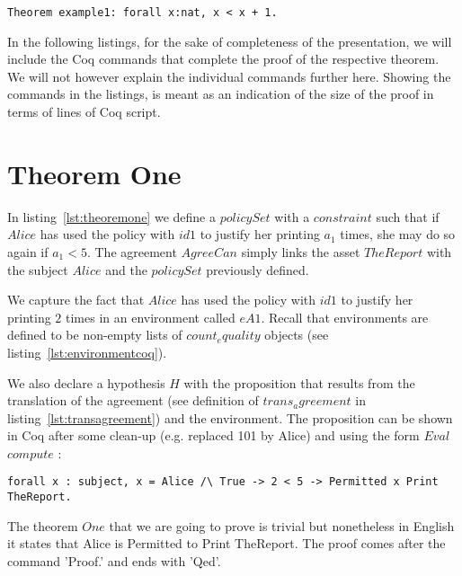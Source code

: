\lstset{language=Coq}
\begin{lstlisting}[frame=single, caption={Proof Example},label={lst:proofexample}]
Theorem example1: forall x:nat, x < x + 1.
\end{lstlisting}

In the following listings, for the sake of completeness of the presentation, we will include the Coq commands that complete the proof of the respective theorem. We will not however explain the individual commands further here. Showing the commands in the listings, is meant as an indication of the size of the proof in terms of lines of Coq script.


\section{Theorem One}

In listing~\ref{lst:theoremone} we define a $policySet$ with a $constraint$ such that if $Alice$ has used the policy with $id1$ to justify her printing $a_{1}$ times, she may do so again if $a_{1} < 5$. The agreement $AgreeCan$ simply links the asset $TheReport$ with the subject $Alice$ and the $policySet$ previously defined. 

We capture the fact that $Alice$ has used the policy with $id1$ to justify her printing $2$ times in an environment called $eA1$. Recall that environments are defined to be non-empty lists of $count_equality$ objects (see listing~\ref{lst:environmentcoq}). 

We also declare a hypothesis $H$ with the proposition that results from the translation of the agreement (see definition of $trans_agreement$ in listing~\ref{lst:transagreement}) and the environment. The proposition can be shown in Coq after some clean-up (e.g. replaced 101 by Alice) and using the form $Eval$ $compute$ : 

\lstset{language=Coq}
\begin{lstlisting}[frame=single, caption={Hypothesis for Theorem One},label={lst:theoremonehypo}]
forall x : subject, x = Alice /\ True -> 2 < 5 -> Permitted x Print TheReport.
\end{lstlisting}

The theorem $One$ that we are going to prove is trivial but nonetheless in English it states that Alice is Permitted to Print TheReport. The proof comes after the command 'Proof.' and ends with 'Qed'. 

